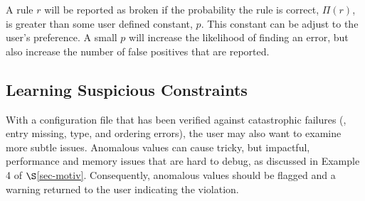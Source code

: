 


A rule $r$ will be reported as broken if the probability the rule is
correct, $\Pi(r)$, is greater than some user defined constant, $p$. This
constant can be adjust to the user's preference. A small $p$ will
increase the likelihood of finding an error, but also increase the
number of false positives that are reported.

\subsection{Learning Suspicious Constraints}
\label{subsec-constraints}

With a configuration file that has been verified against catastrophic
failures (\eg, entry missing, type, and ordering errors), 
the user may also want to examine more subtle issues.
Anomalous values can cause tricky, but impactful, performance and memory
issues that are hard to debug, as discussed in Example 4 of 
$\S$\ref{sec-motiv}. 
Consequently, anomalous values should be flagged and a warning returned
to the user indicating the violation.

